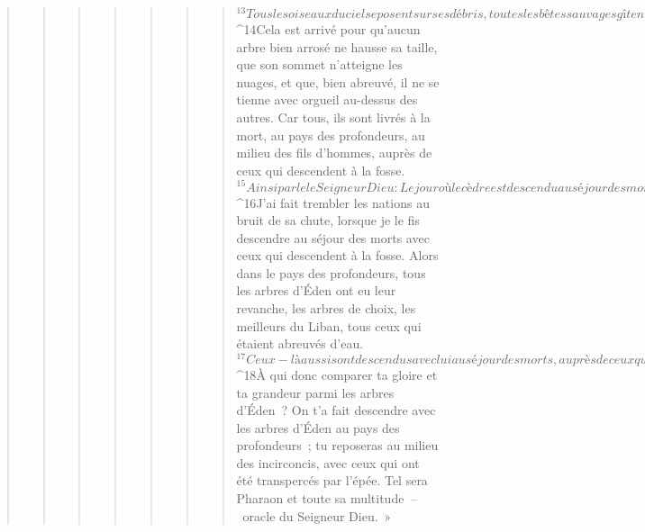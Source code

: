 \begin{verse}
\begin{verse}
\begin{verse}
\begin{verse}
\begin{verse}
\begin{verse}
\begin{verse}
${}^{13}Tous les oiseaux du ciel se posent sur ses débris,
        toutes les bêtes sauvages gîtent dans ses branches.
${}^{14}Cela est arrivé pour qu’aucun arbre bien arrosé ne hausse sa taille, que son sommet n’atteigne les nuages, et que, bien abreuvé, il ne se tienne avec orgueil au-dessus des autres. Car tous, ils sont livrés à la mort, au pays des profondeurs, au milieu des fils d’hommes, auprès de ceux qui descendent à la fosse.
${}^{15}Ainsi parle le Seigneur Dieu : Le jour où le cèdre est descendu au séjour des morts, j’ai fait prendre le deuil ; sur lui j’ai refermé l’Abîme, j’ai arrêté ses fleuves, et les grandes eaux ont été retenues ; à cause de lui j’ai assombri le Liban ; j’ai fait dépérir tous les arbres de la campagne à cause de lui. 
${}^{16}J’ai fait trembler les nations au bruit de sa chute, lorsque je le fis descendre au séjour des morts avec ceux qui descendent à la fosse. Alors dans le pays des profondeurs, tous les arbres d’Éden ont eu leur revanche, les arbres de choix, les meilleurs du Liban, tous ceux qui étaient abreuvés d’eau. 
${}^{17}Ceux-là aussi sont descendus avec lui au séjour des morts, auprès de ceux qui ont été transpercés par l’épée. Ils étaient son bras et habitaient à son ombre au milieu des nations. 
${}^{18}À qui donc comparer ta gloire et ta grandeur parmi les arbres d’Éden ? On t’a fait descendre avec les arbres d’Éden au pays des profondeurs ; tu reposeras au milieu des incirconcis, avec ceux qui ont été transpercés par l’épée. Tel sera Pharaon et toute sa multitude – oracle du Seigneur Dieu. »
      

\end{verse}
\end{verse}
\end{verse}
\end{verse}
\end{verse}
\end{verse}
\end{verse}
